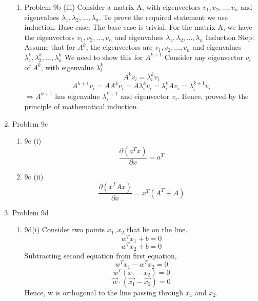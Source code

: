 \documentclass[11pt]{article}
\newcommand{\solution}[1]{{{\color{blue}{\bf Solution:} {#1}}}}
\begin{document}
\begin{enumerate}
\begin{enumerate}
\item Problem 9b (iii) \newline
\solution{}
Consider a matrix A, with eigenvectors $v_{1}, v_{2}, ... , v_{n}$ and eigenvalues 
$\lambda_{1}, \lambda_{2}, ..., \lambda_{n}$. \newline
To prove the required statement we use induction. \newline
Base case:
The base case is trivial. For the matrix A, we have the eigenvectors 
$v_{1}, v_{2}, ... , v_{n}$ and eigenvalues $\lambda_{1}, \lambda_{2}, ..., \lambda_{n}$ \newline
Induction Step: \newline
Assume that for $A^k$, the eigenvectors are $v_{1}, v_{2}, ... , v_{n}$ and eigenvalues $\lambda_{1}^k, \lambda_{2}^k, ..., \lambda_{n}^k$ \newline
We need to show this for $A^{k+1}$ \newline
Consider any eigenvector $v_{i}$ of $A^{k}$, with eigenvalue $\lambda_{i}^{k}$
$$ A^k v_{i} = \lambda_{i}^{k} v_{i}$$ 
$$ A^{k+1} v_{i} = A A^{k} v_{i} = A \lambda_{i}^{k} v_{i} = \lambda_{i}^{k} A v_{i} = \lambda_{i}^{k+1} v_{i}$$
$\Rightarrow A^{k+1}$ has eigenvalue $\lambda_{i}^{k+1}$ and eigenvector $v_{i}$. \newline
Hence, proved by the principle of mathematical induction.
\end{enumerate}

\item Problem 9c \newline
\begin{enumerate}
\item 9c (i) \newline
\solution{} 
$$
\frac{\partial (a^T x)}{\partial x} = a^T
$$

\item 9c (ii) \newline
\solution{}
$$
\frac{\partial (x^T Ax)}{\partial x} = x^T (A^T + A)
$$

\end{enumerate}

\item Problem 9d \newline
\begin{enumerate}
\item 9d(i) \newline
\solution{}
Consider two points $x_{1}, x_{2}$ that lie on the line.
$$ w^T x_{1} + b = 0$$
$$ w^T x_{2} + b = 0$$
Subtracting second equation from first equation,
$$ w^T x_{1} - w^T x_{2} = 0$$
$$ w^T (x_{1} - x_{2}) = 0 $$
$$ \vec{w} \cdot (\vec{x_{1}} - \vec{x_{2}}) = 0$$
Hence, w is orthogonal to the line passing through $x_{1}$ and $x_{2}$.


\end{enumerate}
\end{enumerate}
\end{document}

